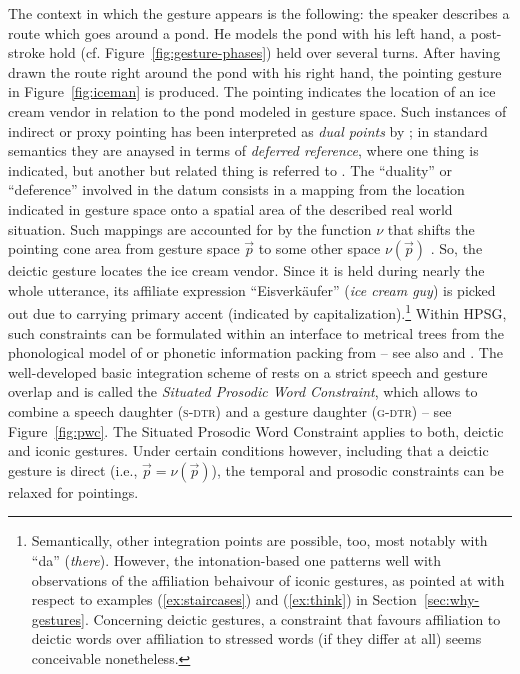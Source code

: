 \documentclass[output=paper]{langsci/langscibook}
\begin{document}
The context in which the gesture appears is the following: the speaker describes a route which goes around a pond. 
%
He models the pond with his left hand, a post-stroke hold (cf. Figure~\ref{fig:gesture-phases}) held over several turns.
%
After having drawn the route right around the pond with his right hand, the pointing gesture in Figure~\ref{fig:iceman} is produced.
%
The pointing indicates the location of an ice cream vendor in relation to the pond modeled in gesture space. 
%
Such instances of indirect or proxy pointing  has been interpreted as \emph{dual points}  by \citet{Goodwin:2003}; in standard semantics they are anaysed in terms of \emph{deferred reference},  where one thing is indicated, but another but related thing is referred to \citep{Quine:1950,Nunberg:1993}. 
%
The \enquote{duality} or \enquote{deference} involved in the datum consists in a mapping from the location indicated in gesture space onto a spatial area of the described real world situation.
%
Such mappings are accounted for by the function $\nu$ that shifts the pointing cone area from gesture space $\vec{p}$ to some other space $\nu(\vec{p})$ \citep{Lascarides:Stone:2009:a}.
%
So, the deictic gesture locates the ice cream vendor. 
%
Since it is held during nearly the whole utterance, its affiliate expression \enquote{Eisverkäufer} (\textit{ice cream guy}) is picked out due to carrying primary accent (indicated by capitalization).\footnote{Semantically, other integration points are possible, too, most notably with \enquote{da} (\textit{there}). However, the intonation-based one patterns well with observations of the affiliation behaivour of iconic gestures, as pointed at with respect to examples (\ref{ex:staircases}) and (\ref{ex:think}) in Section~\ref{sec:why-gestures}. Concerning deictic gestures, a constraint that favours affiliation to deictic words over affiliation to stressed words (if they differ at all) seems conceivable nonetheless.}
%
Within HPSG, such constraints can be formulated within an interface to metrical trees from the phonological model of \citet{Klein:2000} or phonetic information packing from \citet{Engdahl:Vallduvi:1996} -- see also  and .
%
The well-developed basic integration scheme of \citet[]{Alahverdzhieva:Lascarides:Flickinger:2017} rests on a strict speech and gesture overlap and is called the \emph{Situated Prosodic Word Constraint},  which allows to combine a speech daughter (\textsc{s-dtr})  and a gesture daughter (\textsc{g-dtr})  -- see Figure~\ref{fig:pwc}.
%
The Situated Prosodic Word Constraint applies to both, deictic and iconic gestures.
%
Under certain conditions however, including that a deictic gesture is direct (i.e., $\vec{p} = \nu(\vec{p})$), the temporal and prosodic constraints can be relaxed for pointings.  
\end{document}
